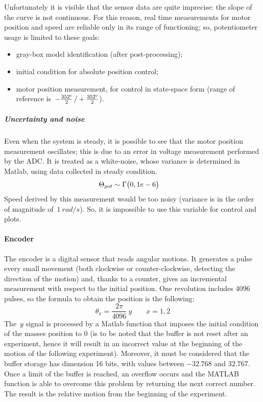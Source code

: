 Unfortunately it is visible that the sensor data are quite imprecise: the slope of the curve is not continuous. For this reason, real time measurements for motor position and speed are reliable only in its range of functioning; so, potentiometer usage is limited to these goals:

\begin{itemize}
	\item gray-box model identification (after post-processing);
	\item initial condition for absolute position control;
	\item motor position measurement, for control in state-space form (range of reference is~$-\frac{352 \degree}{2} \, / +\frac{352 \degree}{2}$).
\end{itemize}

\subparagraph{Uncertainty and noise}
Even when the system is steady, it is possible to see that the motor position measurement oscillates; this is due to an error in voltage measurement performed by the ADC. It is treated as a white-noise, whose variance is determined in Matlab, using data collected in steady condition.
\begin{align*}
	\Theta_{pot} &\sim \Gamma \bigl{(} 0, 1e-6 \bigr{)}
\end{align*}
Speed derived by this measurement would be too noisy (variance is in the order of magnitude of~$1\ rad/s$). So, it is impossible to use this variable for control and plots.

\paragraph{Encoder}

The encoder is a digital sensor that reads angular motions. It generates a pulse every small movement (both clockwise or counter-clockwise, detecting the direction of the motion) and, thanks to a counter, gives an incremental measurement with respect to the initial position. One revolution includes 4096 pulses, so the formula to obtain the position is the following:
\[
	\theta_x = \frac{2\pi}{4096} \ y \qquad x={1,2}
\]
The~$y$ signal is processed by a Matlab function that imposes the initial condition of the masses position to 0 (is to be noted that the buffer is not reset after an experiment, hence it will result in an incorrect value at the beginning of the motion of the following experiment). Moreover, it must be considered that the buffer storage has dimension 16 bits, with values between $-32.768$ and $32.767$. Once a limit of the buffer is reached, an overflow occurs and the MATLAB function is able to overcome this problem by returning the next correct number. The result is the relative motion from the beginning of the experiment.

